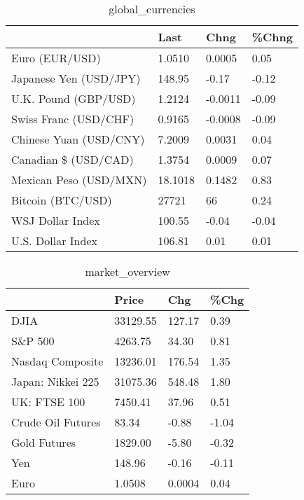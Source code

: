 \documentclass{article}%
\begin{document}
%


\begin{table}[htbp]%
\caption{global\_currencies}%
\centering%
\begin{adjustbox}{width=1\textwidth}%
\begin{tabular}{llll}
\toprule
                       &    Last &    Chng & \%Chng \\
\midrule
        Euro (EUR/USD) &  1.0510 &  0.0005 &  0.05 \\
Japanese Yen (USD/JPY) &  148.95 &   -0.17 & -0.12 \\
  U.K. Pound (GBP/USD) &  1.2124 & -0.0011 & -0.09 \\
 Swiss Franc (USD/CHF) &  0.9165 & -0.0008 & -0.09 \\
Chinese Yuan (USD/CNY) &  7.2009 &  0.0031 &  0.04 \\
  Canadian \$ (USD/CAD) &  1.3754 &  0.0009 &  0.07 \\
Mexican Peso (USD/MXN) & 18.1018 &  0.1482 &  0.83 \\
     Bitcoin (BTC/USD) &   27721 &      66 &  0.24 \\
      WSJ Dollar Index &  100.55 &   -0.04 & -0.04 \\
     U.S. Dollar Index &  106.81 &    0.01 &  0.01 \\
\bottomrule
\end{tabular}
%
\end{adjustbox}%
\end{table}

%


\begin{table}[htbp]%
\caption{market\_overview}%
\centering%
\begin{adjustbox}{width=1\textwidth}%
\begin{tabular}{llll}
\toprule
                  &    Price &    Chg &  \%Chg \\
\midrule
             DJIA & 33129.55 & 127.17 &  0.39 \\
          S\&P 500 &  4263.75 &  34.30 &  0.81 \\
 Nasdaq Composite & 13236.01 & 176.54 &  1.35 \\
Japan: Nikkei 225 & 31075.36 & 548.48 &  1.80 \\
     UK: FTSE 100 &  7450.41 &  37.96 &  0.51 \\
Crude Oil Futures &    83.34 &  -0.88 & -1.04 \\
     Gold Futures &  1829.00 &  -5.80 & -0.32 \\
              Yen &   148.96 &  -0.16 & -0.11 \\
             Euro &   1.0508 & 0.0004 &  0.04 \\
\bottomrule
\end{tabular}
%
\end{adjustbox}%
\end{table}

%
\end{document}

